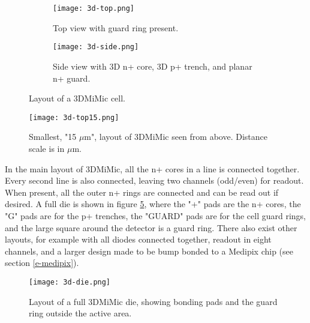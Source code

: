 \documentclass[../main/thesis.tex]{subfiles}
\begin{document}


\begin{figure}
	\centering
	\begin{subfigure}{.5\textwidth}
		\centering
		\texttt{[image: 3d-top.png]}
		\caption{Top view with guard ring present.}
		\label{fig-3dmimic-top}
	\end{subfigure}%
	\begin{subfigure}{.5\textwidth}
		\centering
		\texttt{[image: 3d-side.png]}
		\caption{Side view with 3D n+ core, 3D p+ trench, and planar n+ guard.}
		\label{fig-3dmimic-side} %
	\end{subfigure}
	\caption{Layout of a 3DMiMic cell. \citep{Marco}}
	\label{fig-3dmimic-top-side}
\end{figure}


\begin{figure}[h]
	\centering
	\texttt{[image: 3d-top15.png]}
	\caption{Smallest, "15 $\mu$m", layout of 3DMiMic seen from above. Distance scale is in $\mu$m. \citep{Marco}}
	\label{fig-3dmimic-top15} %
\end{figure}

In the main layout of 3DMiMic, all the n+ cores in a line is connected together. Every second line is also connected, leaving two channels (odd/even) for readout. When present, all the outer n+ rings are connected and can be read out if desired. A full die is shown in figure \ref{fig-3dmimic-die}, where the "+" pads are the n+ cores, the "G" pads are for the p+ trenches, the "GUARD" pads are for the cell guard rings, and the large square around the detector is a guard ring. There also exist other layouts, for example with all diodes connected together, readout in eight channels, and a larger design made to be bump bonded to a Medipix chip (see section \ref{e-medipix}). 

\begin{figure}%
	\centering
	\texttt{[image: 3d-die.png]}
	\caption{Layout of a full 3DMiMic die, showing bonding pads and the guard ring outside the active area. \citep{Marco}}
	\label{fig-3dmimic-die} %
\end{figure}
\end{document}
